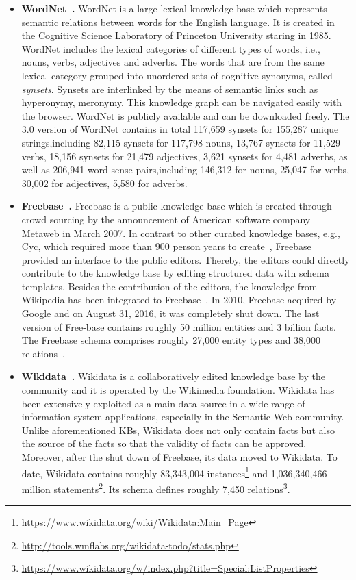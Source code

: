 \begin{itemize}
\item \textbf{WordNet~\cite{fellbaum98wordnet}.} WordNet is a large lexical knowledge base which represents semantic relations between words for the English language. It is created in the Cognitive Science Laboratory of Princeton University staring in 1985. WordNet includes the lexical categories of different types of words, i.e., nouns, verbs, adjectives and adverbs. The words that are from the same lexical category grouped into unordered sets of cognitive synonyms, called \textit{synsets}. Synsets are interlinked by the means of semantic links such as hyperonymy, meronymy. This knowledge graph can be navigated easily with the browser. WordNet is publicly available and can be downloaded freely. The 3.0 version of WordNet contains in total 117,659 synsets for 155,287 unique strings,including 82,115 synsets for 117,798 nouns, 13,767 synsets for 11,529 verbs, 18,156 synsets for 21,479 adjectives, 3,621 synsets for 4,481 adverbs, as well as 206,941 word-sense pairs,including 146,312 for nouns, 25,047 for verbs, 30,002 for adjectives, 5,580 for adverbs.\\

\item \textbf{Freebase~\cite{DBLP:conf/sigmod/BollackerEPST08}.} Freebase is a public knowledge base which is created through crowd sourcing by the announcement of American software company Metaweb in March 2007. In contrast to other curated knowledge bases, e.g., Cyc, which required more than 900 person years to create~\cite{DBLP:journals/semweb/Paulheim17}, Freebase provided an interface to the public editors.  Thereby, the editors could directly contribute to the knowledge base by editing structured data with schema templates. Besides the contribution of the editors, the knowledge from Wikipedia has been integrated to Freebase~\cite{farber2015comparative}. In 2010, Freebase acquired by Google and on August 31, 2016, it was completely shut down. The last version of Free-base contains roughly 50 million entities and 3 billion facts. The Freebase schema comprises roughly 27,000 entity types and 38,000 relations~\cite{DBLP:journals/semweb/Paulheim17}.\\

\item \textbf{Wikidata~\cite{DBLP:journals/cacm/VrandecicK14}.} Wikidata is a collaboratively edited knowledge base by the community and it is operated by the Wikimedia foundation. Wikidata has been extensively exploited as a main data source in a wide range of information system applications, especially in the Semantic Web community. Unlike aforementioned KBs, Wikidata does not only contain facts but also the source of the facts so that the validity of facts can be approved. Moreover, after the shut down of Freebase, its data moved to Wikidata. To date, Wikidata contains roughly 83,343,004 instances\footnote{\url{https://www.wikidata.org/wiki/Wikidata:Main_Page}} and 1,036,340,466 million statements\footnote{\url{http://tools.wmflabs.org/wikidata-todo/stats.php}}. Its schema defines roughly 7,450 relations\footnote{\url{https://www.wikidata.org/w/index.php?title=Special:ListProperties}}.\\


\end{itemize}
